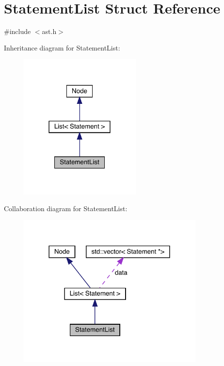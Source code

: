 \hypertarget{struct_statement_list}{}\section{Statement\+List Struct Reference}
\label{struct_statement_list}


{\ttfamily \#include $<$ast.\+h$>$}



Inheritance diagram for Statement\+List\+:\nopagebreak
\begin{figure}[H]
\begin{center}
\leavevmode
\includegraphics[width=174pt]{struct_statement_list__inherit__graph}
\end{center}
\end{figure}


Collaboration diagram for Statement\+List\+:\nopagebreak
\begin{figure}[H]
\begin{center}
\leavevmode
\includegraphics[width=266pt]{struct_statement_list__coll__graph}
\end{center}
\end{figure}
